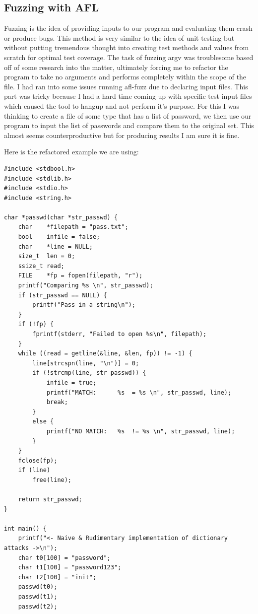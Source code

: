\documentclass[12pt, letterpaper]{article}
\begin{document}
\begin{sloppypar}
\begin{flushleft}
\section*{Fuzzing with AFL}
Fuzzing is the idea of providing inputs to our program and evaluating them crash or produce
bugs. This method is very similar to the idea of unit testing but without putting tremendous 
thought into creating test methods and values from scratch for optimal test coverage. The task 
of fuzzing argv was troublesome based off of some research into the matter, ultimately forcing 
me to refactor the program to take no arguments and performs completely within the scope of 
the file. I had ran into some issues running afl-fuzz due to declaring input files. This part 
was tricky because I had a hard time coming up with specific test input files which caused 
the tool to hangup and not perform it's purpose. For this I was thinking to create a file of 
some type that has a list of password, we then use our program to input the list of passwords 
and compare them to the original set. This almost seems counterproductive but for producing
results I am sure it is fine. 

Here is the refactored example we are using:

\begin{lstlisting}
#include <stdbool.h>
#include <stdlib.h>
#include <stdio.h>
#include <string.h>

char *passwd(char *str_passwd) {
    char    *filepath = "pass.txt";
    bool    infile = false;
    char    *line = NULL;
    size_t  len = 0;
    ssize_t read;
    FILE    *fp = fopen(filepath, "r");
    printf("Comparing %s \n", str_passwd);
    if (str_passwd == NULL) {
        printf("Pass in a string\n");
    }
    if (!fp) {
        fprintf(stderr, "Failed to open %s\n", filepath);
    }
    while ((read = getline(&line, &len, fp)) != -1) {
        line[strcspn(line, "\n")] = 0;
        if (!strcmp(line, str_passwd)) {
            infile = true;
            printf("MATCH:      %s  = %s \n", str_passwd, line);
            break;
        }
        else {
            printf("NO MATCH:   %s  != %s \n", str_passwd, line);
        }
    }
    fclose(fp);
    if (line)
        free(line);

    return str_passwd;
}

int main() {
    printf("<- Naive & Rudimentary implementation of dictionary attacks ->\n");
    char t0[100] = "password";
    char t1[100] = "password123";
    char t2[100] = "init";
    passwd(t0);
    passwd(t1);
    passwd(t2);
    

\end{lstlisting}
\end{flushleft}
\end{sloppypar}
\end{document}
